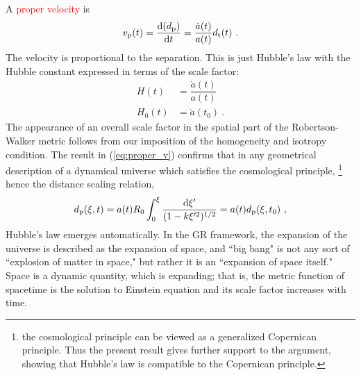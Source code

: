 \documentclass[12pt,a4paper]{article}
\newcommand{\dif}{\mathrm{d}}
\begin{document}
\cite{cheng2005relativity} A \textcolor{red}{proper velocity} is
\begin{equation}
v_{\rm p}(t) = \dfrac{\dif (d_{\rm p})}{\dif t} = \dfrac{\dot{a}(t)}{a(t)} d_{\rm t}(t) ~.
\label{eq:proper_v}
\end{equation}
The velocity is proportional to the separation. This is just Hubble's law with the Hubble constant expressed in terms of the scale factor:
\begin{align*}
H(t) &= \dfrac{\dot{a}(t)}{a(t)} \\
H_0(t) &= \dot{a}(t_0) ~.
\end{align*}
The appearance of an overall scale factor in the spatial part of the Robertson-Walker metric follows from our imposition of the homogeneity
and isotropy condition. The result in (\ref{eq:proper_v}) confirms that in any geometrical description of a dynamical universe which satisfies the cosmological principle, \footnote{the cosmological principle can be viewed as a generalized Copernican principle. Thus the present result gives further support to the argument, showing that Hubble's law is compatible to the Copernican principle.} hence the distance scaling relation, 
\begin{equation}
d_{\rm p} (\xi ,t) = a(t) R_0 \int_0^\xi \dfrac{\dif \xi^\prime}{(1-k\xi^{\prime 2})^{1/2} } = a(t) d_{\rm p}(\xi ,t_0)~,
\end{equation}
Hubble's law emerges automatically. In the GR framework, the expansion of the universe is described as the expansion of space, and ``big
bang" is not any sort of ``explosion of matter in space," but rather it is an ``expansion of space itself." Space is a dynamic quantity, which is expanding; that is, the metric function of spacetime is the solution to Einstein equation and its scale factor increases with time.
\end{document}
